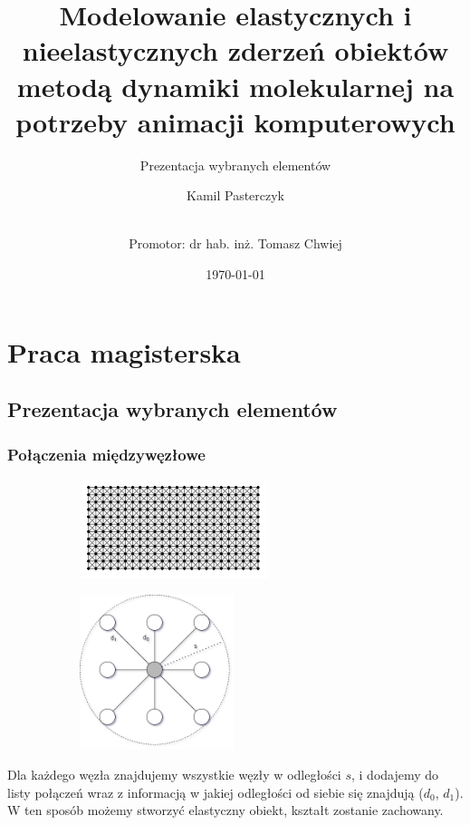 \documentclass{beamer}
\title{Modelowanie elastycznych i nieelastycznych zderzeń obiektów 
metodą dynamiki molekularnej na potrzeby animacji komputerowych}
\subtitle{Prezentacja wybranych elementów}
\author[Kamil Pasterczyk]{Kamil Pasterczyk \and \\ Promotor: dr hab. inż. Tomasz Chwiej}
\institute[AGH]{AGH University of Science and Technology}
\date{\today}
\begin{document}
\section{Praca magisterska}
\subsection{Prezentacja wybranych elementów}

\begin{frame}
    \titlepage
\end{frame}

\begin{frame}
    \frametitle{Połączenia międzywęzłowe}

    \begin{figure}[h]
        \begin{subfigure}{0.45\textwidth}
            \centering
            \includegraphics[width=5.5cm]{12x24}
        \end{subfigure}
        \begin{subfigure}{0.45\textwidth}
            \centering
            \includegraphics[width=4.5cm]{connections.drawio}
        \end{subfigure}
    \end{figure}

    Dla każdego węzła znajdujemy wszystkie węzły w odległości $s$, i dodajemy do listy połączeń wraz z informacją
    w jakiej odległości od siebie się znajdują ($d_0$, $d_1$). W ten sposób możemy stworzyć elastyczny obiekt, kształt
    zostanie zachowany.
\end{frame}
\end{document}
